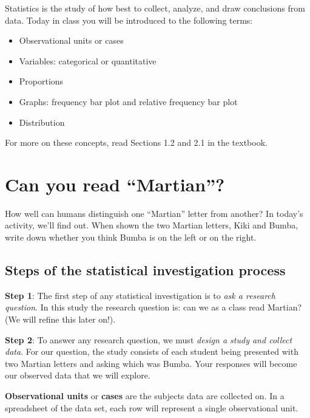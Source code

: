 \documentclass[
]{report}
\begin{document}
Statistics is the study of how best to collect, analyze, and draw conclusions from data. Today in class you will be introduced to the following terms:

\begin{itemize}
\item
  Observational units or cases
\item
  Variables: categorical or quantitative
\item
  Proportions
\item
  Graphs: frequency bar plot and relative frequency bar plot
\item
  Distribution
\end{itemize}

For more on these concepts, read Sections 1.2 and 2.1 in the textbook.

\hypertarget{can-you-read-martian}{%
\section{Can you read ``Martian''?}\label{can-you-read-martian}}

How well can humans distinguish one ``Martian'' letter from another? In today's activity, we'll find out. When shown the two Martian letters, Kiki and Bumba, write down whether you think Bumba is on the left or on the right.

\vspace{0.3in}

\hypertarget{steps-of-the-statistical-investigation-process}{%
\subsection{Steps of the statistical investigation process}\label{steps-of-the-statistical-investigation-process}}

\textbf{Step 1}: The first step of any statistical investigation is to \emph{ask a research question}. In this study the research question is: can we as a class read Martian? (We will refine this later on!).

\textbf{Step 2}: To answer any research question, we must \emph{design a study and collect data}. For our question, the study consists of each student being presented with two Martian letters and asking which was Bumba. Your responses will become our observed data that we will explore.

\newpage

\textbf{Observational units} or \textbf{cases} are the subjects data are collected on. In a spreadsheet of the data set, each row will represent a single observational unit.
\end{document}

